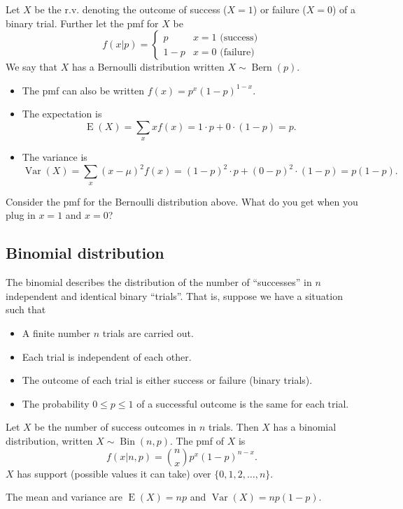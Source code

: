 \documentclass[
]{book}
\providecommand{\tightlist}{%
  \setlength{\itemsep}{0pt}\setlength{\parskip}{0pt}}
\DeclareMathOperator{\E}{E}
\DeclareMathOperator{\Var}{Var}
\DeclareMathOperator{\Bin}{Bin}
\DeclareMathOperator{\Bern}{Bern}
\theoremstyle{definition}
\theoremstyle{definition}
\theoremstyle{definition}
\theoremstyle{definition}
\theoremstyle{remark}
\begin{document}
Let \(X\) be the r.v. denoting the outcome of success (\(X=1\)) or failure (\(X=0\)) of a binary trial.
Further let the pmf for \(X\) be
\[
f(x|p) = \begin{cases}
p & x=1\text{ (success)}\\
1-p &x=0 \text{ (failure)}
\end{cases}
\]
We say that \(X\) has a Bernoulli distribution written \(X\sim\Bern(p)\).

\begin{itemize}
\tightlist
\item
  The pmf can also be written \(f(x)=p^x(1-p)^{1-x}\).
\item
  The expectation is
  \[
  \E(X) = \sum_x xf(x) = 1\cdot p + 0 \cdot (1-p) = p.
  \]
\item
  The variance is
  \[
  \Var(X) = \sum_x (x-\mu)^2f(x) = (1-p)^2\cdot p + (0-p)^2 \cdot (1-p) = p(1-p).
  \]
\end{itemize}

Consider the pmf for the Bernoulli distribution above. What do you get when you plug in \(x=1\) and \(x=0\)?

\hypertarget{binomial-distribution}{%
\subsection{Binomial distribution}\label{binomial-distribution}}

The binomial describes the distribution of the number of ``successes'' in \(n\) independent and identical binary ``trials''. That is, suppose we have a situation such that

\begin{itemize}
\tightlist
\item
  A finite number \(n\) trials are carried out.
\item
  Each trial is independent of each other.
\item
  The outcome of each trial is either success or failure (binary trials).
\item
  The probability \(0 \leq p\leq 1\) of a successful outcome is the same for each trial.
\end{itemize}

Let \(X\) be the number of success outcomes in \(n\) trials. Then \(X\) has a binomial distribution, written \(X\sim\Bin(n,p)\).
The pmf of \(X\) is
\[
f(x|n,p) = {n \choose x}p^x (1-p)^{n-x}.
\]
\(X\) has support (possible values it can take) over \(\{0,1,2,\dots,n\}\).

The mean and variance are \(\E(X)=np\) and \(\Var(X)=np(1-p)\).
\end{document}
